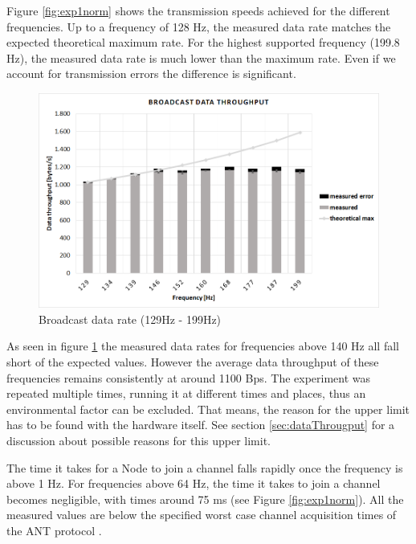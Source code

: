 \begin{description}
	Figure \ref{fig:exp1norm} shows the transmission speeds achieved for the different frequencies. Up to a frequency of 128 Hz, the measured data rate matches the expected theoretical maximum rate. For the highest supported frequency (199.8 Hz), the measured data rate is much lower than the maximum rate. Even if we account for transmission errors the difference is significant. 
	\begin{figure}[H]
		\centering
		\includegraphics[scale=0.5]{content/images/exp1_detail.png}
		\caption{Broadcast data rate (129Hz - 199Hz)}\label{fig:exp1between}
	\end{figure}
	As seen in figure \ref{fig:exp1between} the measured data rates for frequencies above 140 Hz all fall short of the expected values. However the average data throughput of these frequencies remains consistently at around 1100 Bps. The experiment was repeated multiple times, running it at different times and places, thus an environmental factor can be excluded. That means, the reason for the upper limit has to be found with the hardware itself. See section \ref{sec:dataThrougput} for a discussion about possible reasons for this upper limit.
	
	The time it takes for a Node to join a channel falls rapidly once the frequency is above 1 Hz. For frequencies above 64 Hz, the time it takes to join a channel becomes negligible, with times around 75 ms (see Figure \ref{fig:exp1norm}). All the measured values are below the specified worst case channel acquisition times of the ANT protocol \cite{AntChan}.
	

\end{description}
